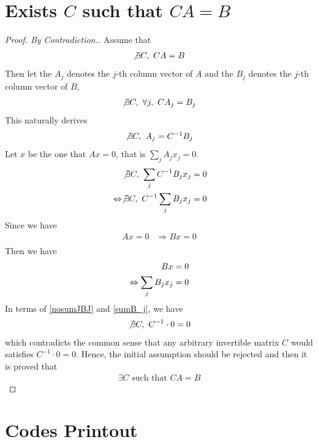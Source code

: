 \documentclass[11pt,a4paper]{article}
\begin{document}
\section{Exists $C$ such that $CA = B$}
\begin{proof}[Proof. By Contradiction.]
    Assume that 
    \begin{align}
        \not \exists C,\ C A = B
    \end{align}
    Then let the $A_j$ denotes the $j$-th column vector of $A$ 
    and the $B_j$ denotes the $j$-th column vector of $B$, 
    \begin{align}
        \not \exists C,\ \forall j,\ C A_j = B_j 
    \end{align}
    This naturally derives
    \begin{align}
        \not \exists C,\ A_j = C^{-1} B_j 
    \end{align}
    Let $x$ be the one that $Ax = 0$, that is $\sum_j A_j x_j = 0$.
    \begin{align}
        \hspace{0.5cm} \not \exists C,\  \sum_j C^{-1} B_j x_j = 0 \\
        \Leftrightarrow 
        \not \exists C,\   C^{-1} \sum_j B_j x_j = 0
        \label{nosumJBJ}
    \end{align}
    Since we have
    \begin{align} 
        Ax = 0 &\Rightarrow  Bx = 0 \\
    \end{align}
    Then we have 
    \begin{align} 
     \hspace{0.5cm}   Bx = 0 \\
     \Leftrightarrow \sum_j B_j x_j = 0 \label{sumB_j}
    \end{align}
    In terms of \eqref{nosumJBJ} and \eqref{sumB_j}, we have
    \begin{align}
        \not \exists C,\  C^{-1} \cdot 0 = 0
    \end{align}
    which contradicts the common sense that any arbitrary invertible matrix
    $C$ would satisfies $C^{-1} \cdot 0 = 0$.
    Hence, the initial assumption should be rejected and then it is proved
    that 
    \begin{align}
        \exists C \text{ such that } CA = B
    \end{align}
\end{proof}

\newpage
\appendix
\section{Codes Printout}
\end{document}
